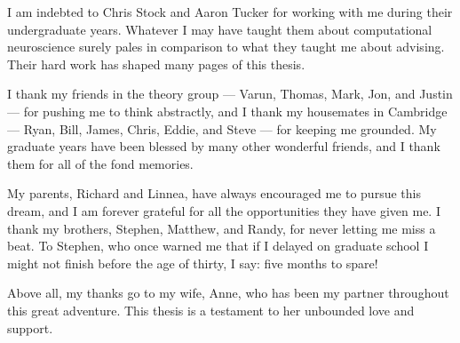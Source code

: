 I am indebted to Chris Stock and Aaron Tucker for working with me
during their undergraduate years. Whatever I may have taught them
about computational neuroscience surely pales
in comparison to what they taught me about advising. Their
hard work has shaped many pages of this thesis. 

I thank my friends in the theory group --- Varun, Thomas,
Mark, Jon, and Justin --- for pushing me to think abstractly, and I
thank my housemates in Cambridge --- Ryan, Bill, James, Chris,
Eddie, and Steve --- for keeping me grounded.
My graduate years have been blessed by many other wonderful friends, 
and I thank them for all of the fond memories.


My parents, Richard and Linnea, have always encouraged me to pursue
this dream, and I am forever grateful for all the opportunities they
have given me. I thank my brothers, Stephen, Matthew, and Randy, for
never letting me miss a beat.  To Stephen, who once warned me that if
I delayed on graduate school I might not finish before the age of
thirty, I say: five months to spare!

Above all, my thanks go to my wife, Anne, who has been my partner
throughout this great adventure. This thesis is a testament to
her unbounded love and support. 

